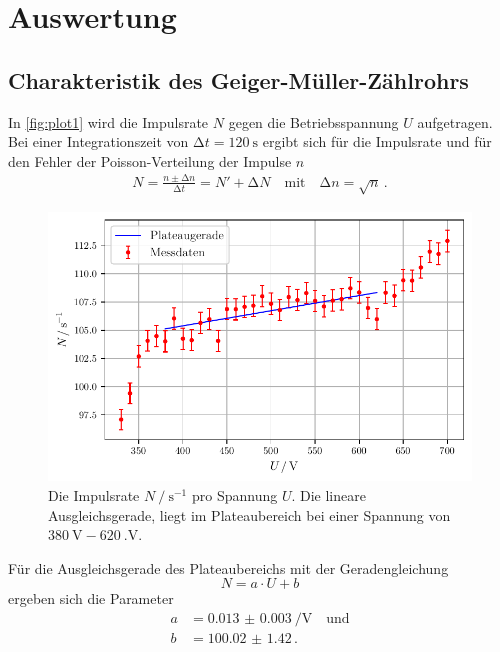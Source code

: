 \section{Auswertung}
\label{sec:Auswertung}

\subsection{Charakteristik des Geiger-Müller-Zählrohrs}

In \autoref{fig:plot1} wird die Impulsrate $N$
gegen die Betriebsspannung $U$ aufgetragen.
Bei einer Integrationszeit von $\increment t = \qty{120}{\second}$ ergibt sich für die Impulsrate
und für den Fehler der Poisson-Verteilung der Impulse $n$
\begin{align} \label{eq:impulsrate}
    N = \frac{n \pm \increment n}{\increment t} = N' + \increment N
    \quad \text{mit} \quad
    \increment n = \sqrt{n} \, .
\end{align}

\begin{figure}
    \centering
    \includegraphics[width = 0.9\linewidth]{build/plot1.pdf}
    \caption{Die Impulsrate $N \mathbin{/} \mathrm{s^{-1}}$ pro Spannung $U$.
    Die lineare Ausgleichsgerade, liegt im Plateaubereich bei einer Spannung
    von $\qty{380}{\volt} - \qty{620}{.\volt}$.}
    \label{fig:plot1}
\end{figure}

Für die Ausgleichsgerade des Plateaubereichs mit der Geradengleichung
\begin{equation*}
    N = a \cdot U + b 
\end{equation*}
ergeben sich die Parameter
\begin{align*}
    a &= \qty{0.013(3)}{\per\volt} \quad \text{und} \\
    b &= \num{100.02(142)} \, .
\end{align*}

